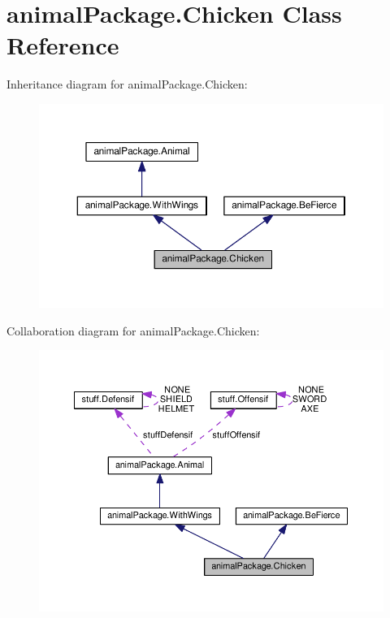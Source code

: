 \hypertarget{classanimal_package_1_1_chicken}{}\section{animal\+Package.\+Chicken Class Reference}
\label{classanimal_package_1_1_chicken}


Inheritance diagram for animal\+Package.\+Chicken\+:\nopagebreak
\begin{figure}[H]
\begin{center}
\leavevmode
\includegraphics[width=350pt]{classanimal_package_1_1_chicken__inherit__graph}
\end{center}
\end{figure}


Collaboration diagram for animal\+Package.\+Chicken\+:\nopagebreak
\begin{figure}[H]
\begin{center}
\leavevmode
\includegraphics[width=350pt]{classanimal_package_1_1_chicken__coll__graph}
\end{center}
\end{figure}
